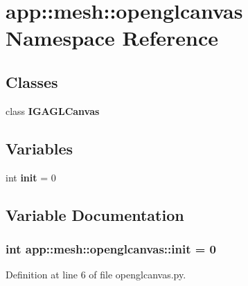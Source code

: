 \section{app::mesh::openglcanvas Namespace Reference}
\label{namespaceapp_1_1mesh_1_1openglcanvas}


\subsection*{Classes}
\begin{CompactItemize}
\item 
class {\bf IGAGLCanvas}
\end{CompactItemize}
\subsection*{Variables}
\begin{CompactItemize}
\item 
int {\bf init} = 0
\end{CompactItemize}


\subsection{Variable Documentation}
\subsubsection{\setlength{\rightskip}{0pt plus 5cm}int {\bf app::mesh::openglcanvas::init} = 0\hspace{0.3cm}{\tt  [static]}}\label{namespaceapp_1_1mesh_1_1openglcanvas_91dd9d5989b1bf62698269739dc881df}




Definition at line 6 of file openglcanvas.py.